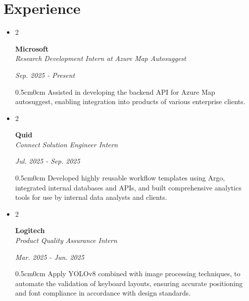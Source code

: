 \documentclass[10pt, letterpaper]{article}
\newenvironment{twocolentry}[2][]{
    \onecolentry
    \def\secondColumn{#2}
    \setcolumnwidth{\fill, 4.5 cm}
    \begin{paracol}{2}
}{
    \switchcolumn \raggedleft \secondColumn
    \end{paracol}
    \endonecolentry
}
\begin{document}
    \section{Experience}
        \begin{itemize}[leftmargin=0.4cm]
            \item
                \begin{twocolentry}{\textit{Sep. 2025 - Present}}
                    \textbf{Microsoft} \\
                    \textit{Research Development Intern at Azure Map Autosuggest}
                \end{twocolentry}
                \vspace{-0.15cm}
                \begin{adjustwidth}{0.5cm}{0cm}
                    Assisted in developing the backend API for Azure Map autosuggest, enabling integration into products of various enterprise clients.
                \end{adjustwidth}
                \vspace{-0.2cm}
            \item 
                \begin{twocolentry}{\textit{Jul. 2025 - Sep. 2025}}
                    \textbf{Quid} \\
                    \textit{Connect Solution Engineer Intern}
                \end{twocolentry}
                \vspace{-0.15cm}
                \begin{adjustwidth}{0.5cm}{0cm}
                    Developed highly reusable workflow templates using Argo, integrated internal databases and APIs, and built comprehensive analytics tools for use by internal data analysts and clients.
                \end{adjustwidth}
                \vspace{-0.2cm}
            
            \item 
                \begin{twocolentry}{\textit{Mar. 2025 - Jun. 2025}}
                    \textbf{Logitech} \\
                    \textit{Product Quality Assurance Intern}
                \end{twocolentry}
                \vspace{-0.15cm}
                \begin{adjustwidth}{0.5cm}{0cm}
                    Apply YOLOv8 combined with image processing techniques, to automate the validation of keyboard layouts, ensuring accurate positioning and font compliance in accordance with design standards.
                \end{adjustwidth}
                \vspace{-0.2cm}


\end{itemize}
\end{document}
